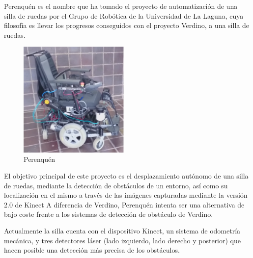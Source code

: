 



Perenquén es el nombre que ha tomado el proyecto de automatización de una silla
de ruedas por el Grupo de Robótica de la Universidad de La Laguna, cuya
filosofía es llevar los progresos conseguidos con el proyecto Verdino, a una
silla de ruedas.

\begin{figure}
  \vspace{-20pt}
  \begin{center}
    \includegraphics[width=0.48\textwidth]{images/cap3/Perenquen.eps}
  \end{center}
  \vspace{-20pt}
  \caption{Perenquén}
  \vspace{-10pt}
  \label{fig:Perenquen}
\end{figure}

El objetivo principal de este proyecto es el desplazamiento autónomo de una
silla de ruedas, mediante la detección de obstáculos de un entorno, así como su
localización en el mismo a través de las imágenes capturadas mediante la versión
2.0 de Kinect A diferencia de Verdino, Perenquén intenta ser una alternativa de
bajo coste frente a los sistemas de detección de obstáculo de Verdino.

Actualmente la silla cuenta con el dispositivo Kinect, un sistema de odometría
mecánica, y tres detectores láser (lado izquierdo, lado derecho y posterior) que
hacen posible una detección más precisa de los obstáculos.

